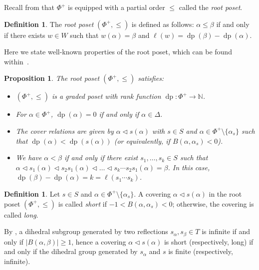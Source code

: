 \documentclass{amsart}
\newtheorem{Proposition}[Theorem]{Proposition}
\theoremstyle{definition}
\newtheorem{Definition}[Theorem]{Definition}
\newcommand{\dep}{\operatorname{dp}}
\begin{document}
Recall from \cite[\S4.6]{BB} that $\Phi^+$ is equipped with a partial order $\leq$ called the \textit{root poset}. 


\begin{Definition}
The \textit{root poset} $(\Phi^+, \leq)$ is defined as follows: $\alpha\leq \beta$ if and only if there exists $w\in W$ such that $w(\alpha)=\beta$ and $\ell(w)=\dep(\beta)-\dep(\alpha)$.     
\end{Definition}


Here we state well-known properties of the root poset, which can be found within~\cite[\S4.6~\&~\S4.7]{BB}.
\begin{Proposition}\label{prop:BasicDepth} The root poset $(\Phi^+,\leq)$ satisfies:
    \begin{itemize}
        \item[(i)] $(\Phi^+,\leq)$ is a graded poset with rank function $\dep: \Phi^+\rightarrow \mathbb{N}$.
        \item[(ii)] For $\alpha\in\Phi^+$, $\dep(\alpha)=0$ if and only if $\alpha\in\Delta$.
        \item[(iii)] The cover relations are given by $\alpha \lhd s(\alpha)$ with $s\in S$ and $\alpha \in \Phi^+\setminus \{\alpha_s\}$ such that $\dep(\alpha)<\dep(s(\alpha))$ (or equivalently, if $B(\alpha,\alpha_s)<0$). 
        \item[(iv)] We have $\alpha<\beta$ if and only if there exist $s_1,\ldots, s_k\in S$ such that $\alpha \lhd s_1(\alpha)\lhd s_2s_1(\alpha)\lhd \ldots \lhd s_k\cdots s_2s_1(\alpha)=\beta$. In this case, $\dep(\beta)-\dep(\alpha)=k=\ell(s_1\cdots s_k)$. 
    \end{itemize}
\end{Proposition}


\begin{Definition}\label{def:long}
    Let $s\in S$ and $\alpha \in \Phi^+\setminus\{\alpha_s\}$. A covering $\alpha \lhd s(\alpha)$ in the root poset $(\Phi^+, \leq)$ is called \textit{short} if $-1<B(\alpha, \alpha_s)<0$; otherwise, the covering is called \textit{long}. 
\end{Definition} 

By \cite[Proposition 4.5.4]{BB}, a dihedral subgroup generated by two reflections $s_{\alpha},s_{\beta}\in T$ is infinite if and only if $|B(\alpha,\beta)|\geq 1$, hence a covering $\alpha \lhd s(\alpha)$ is short (respectively, long) if and only if the dihedral group generated by $s_\alpha$ and $s$ is finite (respectively, infinite).
\end{document}
